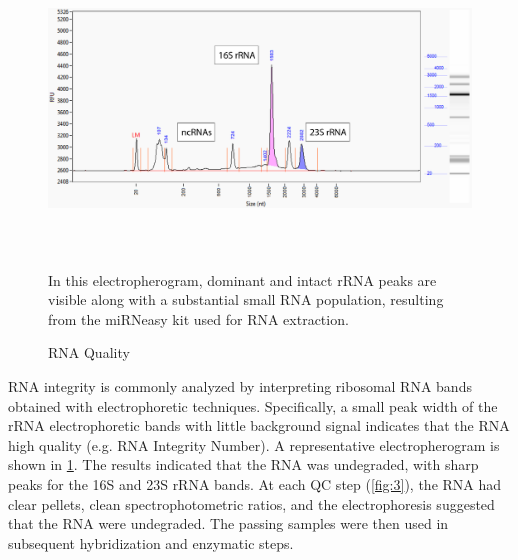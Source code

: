 \begin{figure}
\includegraphics[width=\textwidth,height=3in]{images/Sequencing/RNA-integrity.png}
\caption{RNA Quality}\label{fig:2}
In this electropherogram, dominant and intact rRNA peaks are visible along with a substantial small RNA population, resulting from the miRNeasy kit used for RNA extraction.
\end{figure}

RNA integrity is commonly analyzed by interpreting ribosomal RNA bands obtained with electrophoretic techniques. Specifically, a small peak width of the rRNA electrophoretic bands with little background signal indicates that the RNA high quality (e.g. RNA Integrity Number). A representative electropherogram is shown in \ref{fig:2}. The results indicated that the RNA was undegraded, with sharp peaks for the 16S and 23S rRNA bands. At each QC step (\ref{fig:3}), the RNA had clear pellets, clean spectrophotometric ratios, and the electrophoresis suggested that the RNA were undegraded. The passing samples were then used in subsequent hybridization and enzymatic steps.

